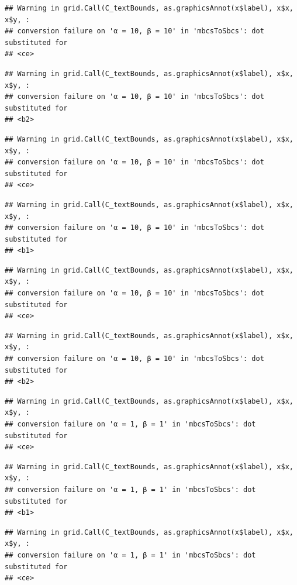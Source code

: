 \documentclass[]{book}
\theoremstyle{definition}
\theoremstyle{definition}
\theoremstyle{definition}
\theoremstyle{remark}
\begin{document}
\begin{verbatim}
## Warning in grid.Call(C_textBounds, as.graphicsAnnot(x$label), x$x, x$y, :
## conversion failure on 'α = 10, β = 10' in 'mbcsToSbcs': dot substituted for
## <ce>
\end{verbatim}

\begin{verbatim}
## Warning in grid.Call(C_textBounds, as.graphicsAnnot(x$label), x$x, x$y, :
## conversion failure on 'α = 10, β = 10' in 'mbcsToSbcs': dot substituted for
## <b2>
\end{verbatim}

\begin{verbatim}
## Warning in grid.Call(C_textBounds, as.graphicsAnnot(x$label), x$x, x$y, :
## conversion failure on 'α = 10, β = 10' in 'mbcsToSbcs': dot substituted for
## <ce>
\end{verbatim}

\begin{verbatim}
## Warning in grid.Call(C_textBounds, as.graphicsAnnot(x$label), x$x, x$y, :
## conversion failure on 'α = 10, β = 10' in 'mbcsToSbcs': dot substituted for
## <b1>
\end{verbatim}

\begin{verbatim}
## Warning in grid.Call(C_textBounds, as.graphicsAnnot(x$label), x$x, x$y, :
## conversion failure on 'α = 10, β = 10' in 'mbcsToSbcs': dot substituted for
## <ce>
\end{verbatim}

\begin{verbatim}
## Warning in grid.Call(C_textBounds, as.graphicsAnnot(x$label), x$x, x$y, :
## conversion failure on 'α = 10, β = 10' in 'mbcsToSbcs': dot substituted for
## <b2>
\end{verbatim}

\begin{verbatim}
## Warning in grid.Call(C_textBounds, as.graphicsAnnot(x$label), x$x, x$y, :
## conversion failure on 'α = 1, β = 1' in 'mbcsToSbcs': dot substituted for
## <ce>
\end{verbatim}

\begin{verbatim}
## Warning in grid.Call(C_textBounds, as.graphicsAnnot(x$label), x$x, x$y, :
## conversion failure on 'α = 1, β = 1' in 'mbcsToSbcs': dot substituted for
## <b1>
\end{verbatim}

\begin{verbatim}
## Warning in grid.Call(C_textBounds, as.graphicsAnnot(x$label), x$x, x$y, :
## conversion failure on 'α = 1, β = 1' in 'mbcsToSbcs': dot substituted for
## <ce>
\end{verbatim}
\end{document}
